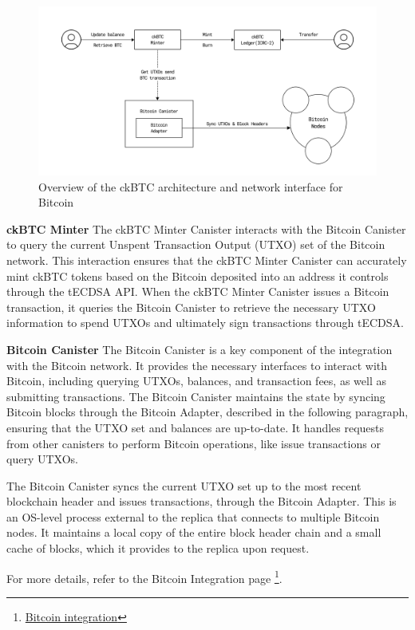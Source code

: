\documentclass{article}
\begin{document}
\begin{figure}[H]
    \centering
    \includegraphics[width=1\textwidth]{ckbtc.png}
    \caption{Overview of the ckBTC architecture and network interface for Bitcoin}
    \label{fig:ckbtc}
\end{figure}

\textbf{ckBTC Minter} The ckBTC Minter Canister interacts with the Bitcoin Canister to query the current Unspent Transaction Output (UTXO) set of the Bitcoin network.  This interaction ensures that the ckBTC Minter Canister can accurately mint ckBTC tokens based on the Bitcoin deposited into an address it controls through the tECDSA API. When the ckBTC Minter Canister issues a Bitcoin transaction, it queries the Bitcoin Canister to retrieve the necessary UTXO information to spend UTXOs and ultimately sign transactions through tECDSA. 

\textbf{Bitcoin Canister}
The Bitcoin Canister is a key component of the integration with the Bitcoin network. It provides the necessary interfaces to interact with Bitcoin, including querying UTXOs, balances, and transaction fees, as well as submitting transactions. The Bitcoin Canister maintains the state by syncing Bitcoin blocks through the Bitcoin Adapter, described in the following paragraph, ensuring that the UTXO set and balances are up-to-date. It handles requests from other canisters to perform Bitcoin operations, like issue transactions or query UTXOs.

The Bitcoin Canister syncs the current UTXO set up to the most recent blockchain header and issues transactions, through the Bitcoin Adapter. This is an OS-level process external to the replica that connects to multiple Bitcoin nodes. It maintains a local copy of the entire block header chain and a small cache of blocks, which it provides to the replica upon request.

For more details, refer to the Bitcoin Integration page \footnote{\href{https://wiki.internetcomputer.org/wiki/Bitcoin_Integration}{Bitcoin integration}}.
\end{document}
